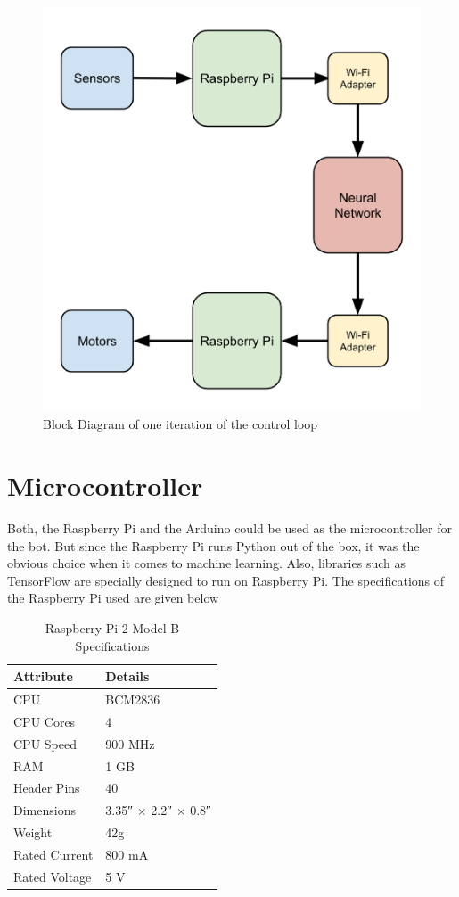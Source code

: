\documentclass[12pt]{extreport}
\theoremstyle{plain}
\theoremstyle{definition}
\begin{document}
\begin{figure}
    \includegraphics[width=\textwidth]{block}
    \caption{Block Diagram of one iteration of the control loop}
\end{figure}

\section{Microcontroller}
Both, the Raspberry Pi and the Arduino could be used as the microcontroller for the bot. But since the Raspberry Pi runs Python out of the box, it was the obvious choice when it comes to machine learning. Also, libraries such as TensorFlow are specially designed to run on Raspberry Pi. The specifications of the Raspberry Pi used are given below

\begin{table}[h]
\centering
\begin{tabular}{ll}
\toprule
Attribute     & Details             \\ \midrule
CPU           & BCM2836             \\
CPU Cores     & 4                   \\
CPU Speed     & 900 MHz             \\
RAM           & 1 GB                \\
Header Pins   & 40                  \\
Dimensions    & 3.35″ × 2.2″ × 0.8″ \\
Weight        & 42g                 \\
Rated Current & 800 mA              \\
Rated Voltage & 5 V                 \\ \bottomrule
\end{tabular}
\caption{Raspberry Pi 2 Model B Specifications}
\end{table}
\end{document}
